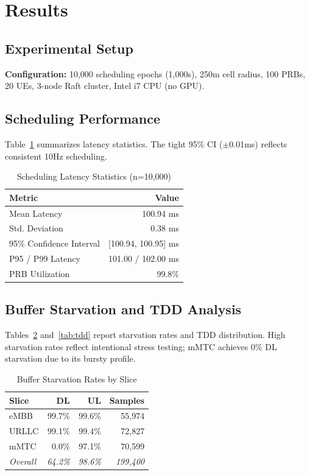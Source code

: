 \documentclass[journal]{IEEEtran}
\begin{document}
\section{Results}

\subsection{Experimental Setup}

\textbf{Configuration:} 10,000 scheduling epochs (1,000s), 250m cell radius, 100 PRBs, 20 UEs, 3-node Raft cluster, Intel i7 CPU (no GPU).

\subsection{Scheduling Performance}

Table~\ref{tab:performance} summarizes latency statistics. The tight 95\% CI ($\pm$0.01ms) reflects consistent 10Hz scheduling.

\begin{table}[h]
\centering
\caption{Scheduling Latency Statistics (n=10,000)}
\label{tab:performance}
\begin{tabular}{@{}lr@{}}
\toprule
\textbf{Metric} & \textbf{Value} \\
\midrule
Mean Latency & 100.94 ms \\
Std. Deviation & 0.38 ms \\
95\% Confidence Interval & [100.94, 100.95] ms \\
P95 / P99 Latency & 101.00 / 102.00 ms \\
PRB Utilization & 99.8\% \\
\bottomrule
\end{tabular}
\end{table}

\subsection{Buffer Starvation and TDD Analysis}

Tables~\ref{tab:starvation} and~\ref{tab:tdd} report starvation rates and TDD distribution. High starvation rates reflect intentional stress testing; mMTC achieves 0\% DL starvation due to its bursty profile.

\begin{table}[h]
\centering
\caption{Buffer Starvation Rates by Slice}
\label{tab:starvation}
\begin{tabular}{@{}lrrr@{}}
\toprule
\textbf{Slice} & \textbf{DL} & \textbf{UL} & \textbf{Samples} \\
\midrule
eMBB & 99.7\% & 99.6\% & 55,974 \\
URLLC & 99.1\% & 99.4\% & 72,827 \\
mMTC & 0.0\% & 97.1\% & 70,599 \\
\midrule
\textit{Overall} & \textit{64.2\%} & \textit{98.6\%} & \textit{199,400} \\
\bottomrule
\end{tabular}
\end{table}
\end{document}
